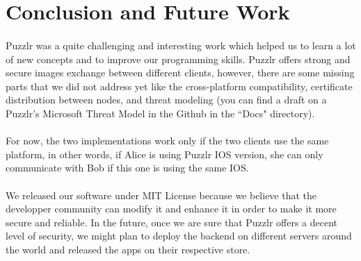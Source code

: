 \section{Conclusion and Future Work}
  \paragraph{}
   Puzzlr was a quite challenging and interesting work which helped us to learn a lot of new concepts and to improve our programming skills. Puzzlr offers strong and secure images exchange between different clients, however, there are some missing parts that we did not address yet like the cross-platform compatibility, certificate distribution between nodes, and threat modeling (you can find a draft on a Puzzlr's Microsoft Threat Model in the Github in the ``Docs" directory).
   \paragraph{}
   For now, the two implementations work only if the two clients use the same platform, in other words, if Alice is using Puzzlr IOS version, she can only communicate with Bob if this one is using the same IOS.
   \paragraph{}
   We released our software under MIT License because we believe that the developper community can modify it and enhance it in order to make it more secure and reliable.
   In the future, once we are sure that Puzzlr offers a decent level of security, we might plan to deploy the backend on different servers around the world and released the apps on their respective store.
